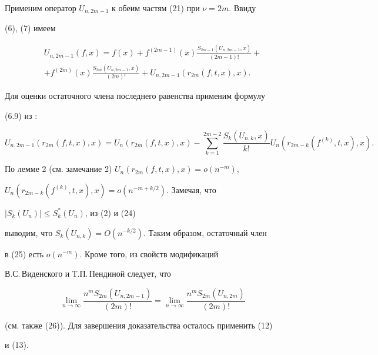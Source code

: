  


\begin{pf} 


Применим оператор $U_{n,2m-1}$ к обеим частям (21) при $\nu=2m$. Ввиду 


(6), (7) имеем 


\begin{multline} 


U_{n,2m-1}(f,x)=f(x)+f^{(2m-1)}(x) 


\frac{S_{2m-1}(U_{n,2m-1},x)}{(2m-1)!}+ \\


+f^{(2m)}(x)\frac{S_{2m}(U_{n,2m-1},x)}{(2m)!}+ 


U_{n,2m-1}(r_{2m}(f,t,x),x). 


\end{multline} 


Для оценки остаточного члена последнего равенства применим формулу 


(6.9) из \cite{4}: 


$$ 


U_{n,2m-1}(r_{2m}(f,t,x),x)=U_n(r_{2m}(f,t,x),x)- 


\sum^{2m-2}_{k=1}\frac{S_k(U_{n,k},x)}{k!} 


U_n(r_{2m-k}(f^{(k)},t,x),x). 


$$ 


По лемме 2 (см. замечание 2) $U_n(r_{2m}(f,t,x),x)=o(n^{-m})$, 


$U_n(r_{2m-k}(f^{(k)},t,x),x)=o(n^{-m+k/2})$. Замечая, что 


$|S_k(U_n)|\le S^*_k(U_n)$, из (2) и (24) 


выводим, что $S_k(U_{n,k})=O(n^{-k/2})$. Таким образом, остаточный член 


в (25) есть $o(n^{-m})$. Кроме того, из свойств модификаций 


В.С.\,Виденского и Т.П.\,Пендиной следует, что 


$$ 


\lim_{n\to\infty}\frac{n^m S_{2m}(U_{n,2m-1})}{(2m)!}= 


\lim_{n\to\infty}\frac{n^m S_{2m}(U_{n,2m})}{(2m)!} 


$$ 


(см. также (26)). Для завершения доказательства осталось применить (12) 


и (13).


\end{pf} 


 


